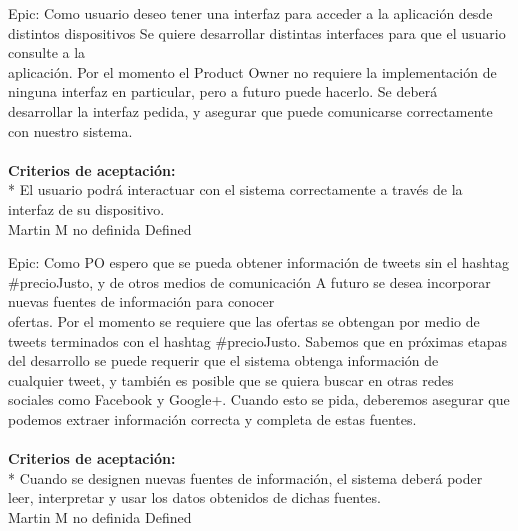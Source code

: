 	{Epic: Como usuario deseo tener una interfaz para acceder a la aplicación desde distintos dispositivos} %
	{Se quiere desarrollar distintas interfaces para que el usuario consulte a la\\
aplicación. Por el momento el Product Owner no requiere la implementación de\\
ninguna interfaz en particular, pero a futuro puede hacerlo. Se deberá\\
desarrollar la interfaz pedida, y asegurar que puede comunicarse correctamente\\
con nuestro sistema.\\
  \\
\textbf{Criterios de aceptación:}\\
* El usuario podrá interactuar con el sistema correctamente a través de la interfaz de su dispositivo.\\
} %
	{} %
	{} %
	{Martin M} %
	{no definida} %
	{Defined} %


\vspace{20pt}

	{Epic: Como PO espero que se pueda obtener información de tweets sin el hashtag #precioJusto, y de otros medios de comunicación} %
	{A futuro se desea incorporar nuevas fuentes de información para conocer\\
ofertas. Por el momento se requiere que las ofertas se obtengan por medio de\\
tweets terminados con el hashtag \#precioJusto. Sabemos que en próximas etapas\\
del desarrollo se puede requerir que el sistema obtenga información de\\
cualquier tweet, y también es posible que se quiera buscar en otras redes\\
sociales como Facebook y Google+. Cuando esto se pida, deberemos asegurar que\\
podemos extraer información correcta y completa de estas fuentes.\\
  \\
\textbf{Criterios de aceptación:}\\
* Cuando se designen nuevas fuentes de información, el sistema deberá poder leer, interpretar y usar los datos obtenidos de dichas fuentes.\\
} %
	{} %
	{} %
	{Martin M} %
	{no definida} %
	{Defined} %


